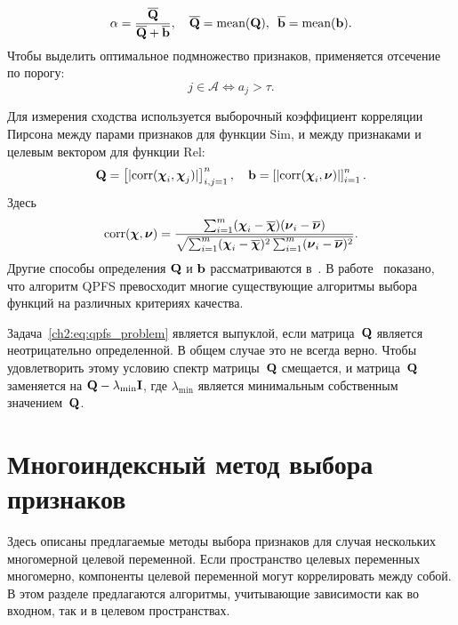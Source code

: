 \begin{equation*}
\alpha = \frac{\overline{\mathbf{Q}}}{\overline{\mathbf{Q}} + \overline{\mathbf{b}}}, \quad \overline{\mathbf{Q}} = \text{mean} (\mathbf{Q}), \,\,\, \overline{\mathbf{b}}= \text{mean} (\mathbf{b}).
\end{equation*}
Чтобы выделить оптимальное подмножество признаков, применяется отсечение по порогу:
\[
j \in \mathcal{A} \Leftrightarrow a_j > \tau.
\]

Для измерения сходства используется выборочный коэффициент корреляции Пирсона между парами признаков для функции Sim, и между признаками и целевым вектором для функции Rel:
\begin{equation}
\mathbf{Q} = \left[|\text{corr}(\boldsymbol{\chi}_i, \boldsymbol{\chi}_j)|\right]_{i,j=1}^n, \quad \mathbf{b} = \left[|\text{corr}(\boldsymbol{\chi}_i, \boldsymbol{\nu})|\right]_{i=1}^n.
\label{ch2:eq:qpfs_1d_qb}
\end{equation}
Здесь
\begin{equation*}
\text{corr}(\boldsymbol{\chi}, \boldsymbol{\nu}) = \frac{\sum_{i=1}^m(\boldsymbol{\chi}_i - \overline{\boldsymbol{\chi}})( \boldsymbol{\nu}_i - \overline{\boldsymbol{\nu}})}{\sqrt{\sum_{i=1}^m(\boldsymbol{\chi}_i - \overline{\boldsymbol{\chi}})^2\sum_{i=1}^m(\boldsymbol{\nu}_i - \overline{\boldsymbol{\nu}})^2}}.
\end{equation*}
Другие способы определения $\mathbf{Q}$ и $\mathbf{b}$ рассматриваются в~\cite{katrutsa2017comprehensive}. 
В работе~\cite{katrutsa2017comprehensive} показано, что алгоритм QPFS превосходит многие существующие алгоритмы выбора функций на различных критериях качества.

Задача~\eqref{ch2:eq:qpfs_problem} является выпуклой, если матрица~$\mathbf{Q}$ является неотрицательно определенной. В общем случае это не всегда верно. 
Чтобы удовлетворить этому условию спектр матрицы~$\mathbf{Q}$ смещается, и матрица~$\mathbf{Q}$ заменяется на $\mathbf{Q} - \lambda_{\text{min}} \mathbf{I}$, где $\lambda_{\text{min}} $ является минимальным собственным значением~$\mathbf{Q}$.

\section{Многоиндексный метод выбора признаков}

Здесь описаны предлагаемые методы выбора признаков для случая нескольких многомерной целевой переменной.
Если пространство целевых переменных многомерно, компоненты целевой переменной могут коррелировать между собой. 
В этом разделе предлагаются алгоритмы, учитывающие зависимости как во входном, так и в целевом пространствах.

